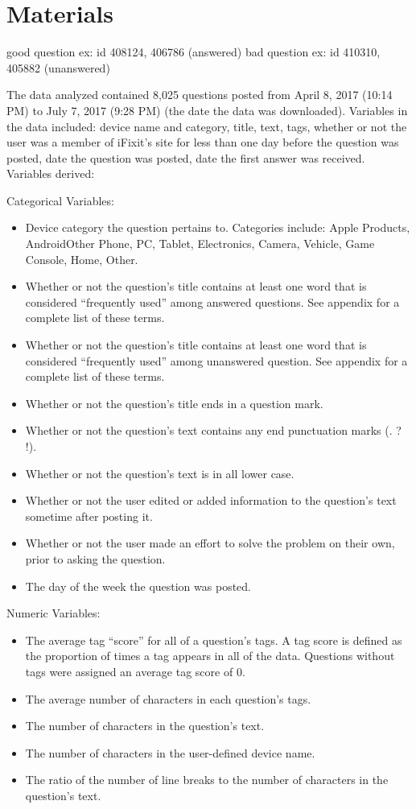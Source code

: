 \documentclass{article}
\begin{document}
\section*{Materials}

good question ex: id 408124, 406786 (answered)
bad question ex: id 410310, 405882 (unanswered) 

The data analyzed contained 8,025 questions posted from April 8, 2017 (10:14 PM) to July 7, 2017 (9:28 PM) (the date the data was downloaded). Variables in the data included: device name and category, title, text, tags, whether or not the user was a member of iFixit's site for less than one day before the question was posted, date the question was posted, date the first answer was received. Variables derived: 

Categorical Variables: 

\begin{itemize}
  \item Device category the question pertains to. Categories include: Apple Products, Android\/Other Phone, PC, Tablet, Electronics, Camera, Vehicle, Game Console, Home, Other.
  \item Whether or not the question's title contains at least one word that is considered ``frequently used'' among answered questions. See appendix for a complete list of these terms. 
  \item Whether or not the question's title contains at least one word that is considered ``frequently used'' among unanswered question. See appendix for a complete list of these terms. 
  \item Whether or not the question's title ends in a question mark.
  \item Whether or not the question's text contains any end punctuation marks (. ? !). 
  \item Whether or not the question's text is in all lower case. 
  \item Whether or not the user edited or added information to the question's text sometime after posting it.
  \item Whether or not the user made an effort to solve the problem on their own, prior to asking the question.
  \item The day of the week the question was posted. 
\end{itemize}

Numeric Variables:

\begin{itemize}
  \item The average tag ``score'' for all of a question's tags. A tag score is defined as the proportion of times a tag appears in all of the data. Questions without tags were assigned an average tag score of 0. 
  \item The average number of characters in each question's tags. 
  \item The number of characters in the question's text. 
  \item The number of characters in the user-defined device name. 
  \item The ratio of the number of line breaks to the number of characters in the question's text.
\end{itemize}
\end{document}
